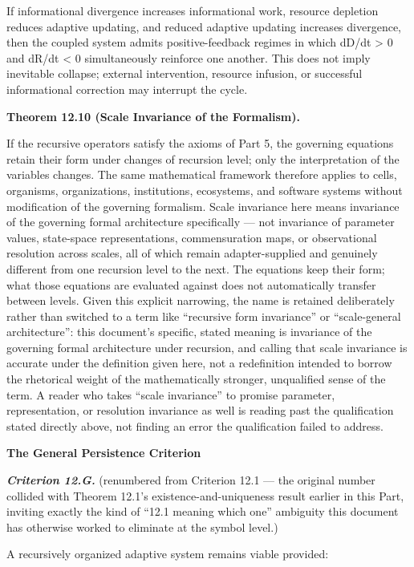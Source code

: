 \documentclass[
]{article}
\begin{document}
If informational divergence increases informational work, resource
depletion reduces adaptive updating, and reduced adaptive updating
increases divergence, then the coupled system admits positive-feedback
regimes in which dD/dt \textgreater{} 0 and dR/dt \textless{} 0
simultaneously reinforce one another. This does not imply inevitable
collapse; external intervention, resource infusion, or successful
informational correction may interrupt the cycle.

\textbf{Theorem 12.10 (Scale Invariance of the Formalism).}

If the recursive operators satisfy the axioms of Part 5, the governing
equations retain their form under changes of recursion level; only the
interpretation of the variables changes. The same mathematical framework
therefore applies to cells, organisms, organizations, institutions,
ecosystems, and software systems without modification of the governing
formalism. Scale invariance here means invariance of the governing
formal architecture specifically --- not invariance of parameter values,
state-space representations, commensuration maps, or observational
resolution across scales, all of which remain adapter-supplied and
genuinely different from one recursion level to the next. The equations
keep their form; what those equations are evaluated against does not
automatically transfer between levels. Given this explicit narrowing,
the name is retained deliberately rather than switched to a term like
``recursive form invariance'' or ``scale-general architecture'': this
document's specific, stated meaning is invariance of the governing
formal architecture under recursion, and calling that scale invariance
is accurate under the definition given here, not a redefinition intended
to borrow the rhetorical weight of the mathematically stronger,
unqualified sense of the term. A reader who takes ``scale invariance''
to promise parameter, representation, or resolution invariance as well
is reading past the qualification stated directly above, not finding an
error the qualification failed to address.

\textbf{The General Persistence Criterion}

\emph{\textbf{Criterion 12.G.}} (renumbered from Criterion 12.1 --- the
original number collided with Theorem 12.1's existence-and-uniqueness
result earlier in this Part, inviting exactly the kind of ``12.1 meaning
which one'' ambiguity this document has otherwise worked to eliminate at
the symbol level.)

A recursively organized adaptive system remains viable provided:
\end{document}
